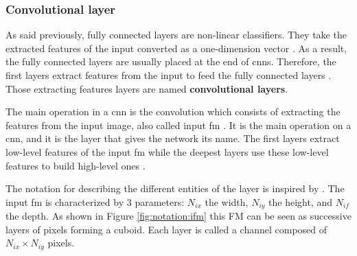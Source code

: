 \subsubsection{Convolutional layer} \label{subs:2dconv}
%
As said previously, fully connected layers are non-linear classifiers. They take the extracted features of the input converted as a one-dimension vector \cite{khan_survey_2020}. As a result, the fully connected layers are usually placed at the end of \acrshort{cnn}s. Therefore, the first layers extract features from the input to feed the fully connected layers \cite{liu_fpga-based_2019}. Those extracting features layers are named \textbf{convolutional layers}.

The main operation in a \acrshort{cnn} is the convolution which consists of extracting the features from the input image, also called input \acrfull{fm} \cite{liu_fpga-based_2019, zhao_towards_2018}. It is the main operation on a \acrshort{cnn}, and it is the layer that gives the network its name. The first layers extract low-level features of the input \acrshort{fm} while the deepest layers use these low-level features to build high-level ones \cite{goodfellow_deep_2016}.

The notation for describing the different entities of the layer is inspired by \textcite{ma_optimizing_2018}. The input \acrshort{fm} is characterized by 3 parameters: \textbf{$N_{ix}$} the width, \textbf{$N_{iy}$} the height, and \textbf{$N_{if}$} the depth. As shown in Figure \ref{fig:notation:ifm} this FM can be seen as successive layers of pixels forming a cuboid. Each layer is called a channel composed of $N_{ix} \times N_{iy}$ pixels.

